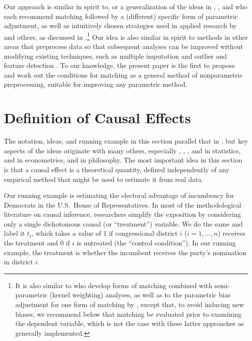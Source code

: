 \documentclass[11pt,titlepage]{article}
\begin{document}
Our approach is similar in spirit to, or a generalization of the ideas
in \citet{RosRub84a}, \citet{Rubin79}, and \citet{RubTho00} who each
recommend matching followed by a (different) specific form of
parametric adjustment, as well as intuitively chosen strategies used
in applied research by \citet{Rosenbaum86} and others, as discussed in
\citet{GlaLevMye03}.\footnote{It is also similar to
  \citet{HecIchTod98} who develop forms of matching combined with
  semi-parametric (kernel weighting) analyses, as well as to the
  parametric bias adjustment for one form of matching by
  \citet{AbaImb04}, except that, to avoid inducing new biases, we
  recommend below that matching be evaluated prior to examining the
  dependent variable, which is not the case with these latter
  approaches as generally implemented.}  Our idea is also similar in
spirit to methods in other areas that preprocess data so that
subsequent analyses can be improved without modifying existing
techniques, such as multiple imputation \citep{Rubin87,KinHonJos01}
and outlier and feature detection \citep[][Ch.8]{Bishop95}.  To our
knowledge, the present paper is the first to propose and work out the
conditions for matching as a general method of nonparametric
preprocessing, suitable for improving any parametric method.

\section{Definition of Causal Effects}

The notation, ideas, and running example in this section parallel that
in \citet[][Section 3.1.1]{KinKeoVer94}, but key aspects of the ideas
originate with many others, especially \citet{Neyman23b},
\citet{Fisher35}, \citet{Cox58}, \citet{Rubin74} and \citet{Holland86}
in statistics, \citet{Roy51} and \citet{Quandt72} in econometrics, and
\citet{Lewis73} in philosophy.  The most important idea in this
section is that a causal effect is a theoretical quantity, defined
independently of any empirical method that might be used to estimate
it from real data.

Our running example is estimating the electoral advantage of
incumbency for Democrats in the U.S.\ House of Representatives.  In
most of the methodological literature on causal inference, researchers
simplify the exposition by considering only a single dichotomous
causal (or ``treatment'') variable.  We do the same and label it
$t_i$, which takes a value of 1 if congressional district $i$
($i=1,\dots,n$) receives the treatment and 0 if $i$ is untreated (the
``control condition'').  In our running example, the treatment is
whether the incumbent receives the party's nomination in district $i$.
\end{document}

